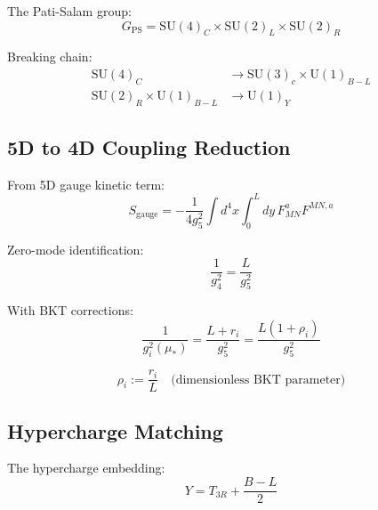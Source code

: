 \documentclass[11pt,a4paper]{article}
\theoremstyle{definition}
\begin{document}
The Pati-Salam group:
\begin{equation}
\label{eq:ps_group}
G_{\text{PS}} = \text{SU}(4)_C \times \text{SU}(2)_L \times \text{SU}(2)_R
\end{equation}

Breaking chain:
\begin{align}
\label{eq:breaking_1}
\text{SU}(4)_C &\to \text{SU}(3)_c \times \text{U}(1)_{B-L} \\
\label{eq:breaking_2}
\text{SU}(2)_R \times \text{U}(1)_{B-L} &\to \text{U}(1)_Y
\end{align}

\subsection{5D to 4D Coupling Reduction}
\label{subsec:5d_4d}

From 5D gauge kinetic term:
\begin{equation}
\label{eq:5d_kinetic}
S_{\text{gauge}} = -\frac{1}{4g_5^2}\int d^4x \int_0^L dy\, F_{MN}^a F^{MN,a}
\end{equation}

Zero-mode identification:
\begin{equation}
\label{eq:g4_from_g5}
\frac{1}{g_4^2} = \frac{L}{g_5^2}
\end{equation}

With BKT corrections:
\begin{equation}
\label{eq:g4_bkt}
\frac{1}{g_i^2(\mu_*)} = \frac{L + r_i}{g_5^2} = \frac{L(1 + \rho_i)}{g_5^2}
\end{equation}

\begin{equation}
\label{eq:rho_def}
\rho_i := \frac{r_i}{L} \quad \text{(dimensionless BKT parameter)}
\end{equation}

\subsection{Hypercharge Matching}
\label{subsec:hypercharge}

The hypercharge embedding:
\begin{equation}
\label{eq:Y_embedding}
Y = T_{3R} + \frac{B-L}{2}
\end{equation}
\end{document}
